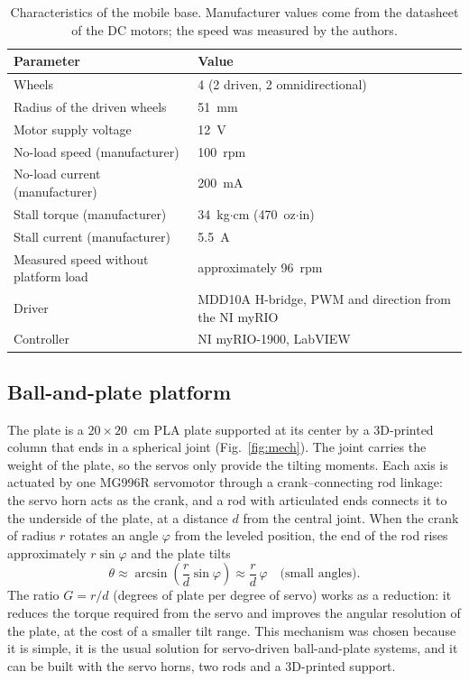 \documentclass[11pt,letterpaper]{article}
\begin{document}
\begin{table}[H]
\centering
\caption{Characteristics of the mobile base. Manufacturer values come
from the datasheet of the DC motors; the speed was measured by the
authors.}
\label{tab:base}
\small
\begin{tabularx}{\textwidth}{@{}L{6cm} Y@{}}
\toprule
\textbf{Parameter} & \textbf{Value} \\
\midrule
Wheels & 4 (2 driven, 2 omnidirectional) \\
Radius of the driven wheels & 51~mm \\
Motor supply voltage & 12~V \\
No-load speed (manufacturer) & 100~rpm \\
No-load current (manufacturer) & 200~mA \\
Stall torque (manufacturer) & 34~kg$\cdot$cm (470~oz$\cdot$in) \\
Stall current (manufacturer) & 5.5~A \\
Measured speed without platform load & approximately 96~rpm \\
Driver & MDD10A H-bridge, PWM and direction from the NI myRIO \\
Controller & NI myRIO-1900, LabVIEW \\
\bottomrule
\end{tabularx}
\end{table}

\subsection{Ball-and-plate platform}
\label{sec:platform}
The plate is a $20\times20$~cm PLA plate supported at its center by a
3D-printed column that ends in a spherical joint (Fig.~\ref{fig:mech}).
The joint carries the weight of the plate, so the servos only provide
the tilting moments. Each axis is actuated by one MG996R servomotor
through a crank--connecting rod linkage: the servo horn acts as the
crank, and a rod with articulated ends connects it to the underside of
the plate, at a distance $d$ from the central joint. When the crank of
radius $r$ rotates an angle $\varphi$ from the leveled position, the
end of the rod rises approximately $r\sin\varphi$ and the plate tilts
\begin{equation}
\theta \approx \arcsin\!\left(\frac{r}{d}\sin\varphi\right)
\approx \frac{r}{d}\,\varphi \quad\text{(small angles)}.
\label{eq:linkage}
\end{equation}
The ratio $G=r/d$ (degrees of plate per degree of servo) works as a
reduction: it reduces the torque required from the servo and improves
the angular resolution of the plate, at the cost of a smaller tilt
range. This mechanism was chosen because it is simple, it is the usual
solution for servo-driven ball-and-plate systems, and it can be built
with the servo horns, two rods and a 3D-printed support.
\end{document}
